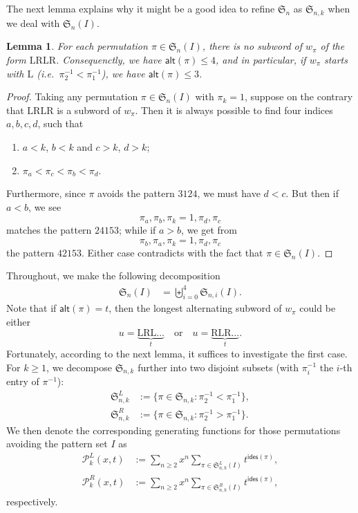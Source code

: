 \documentclass[reqno]{amsart}
\numberwithin{equation}{section}
\theoremstyle{plain}
\newtheorem{lemma}[theorem]{Lemma}
\theoremstyle{definition}
\theoremstyle{named}
\newcommand{\fS}{\mathfrak{S}}
\newcommand{\ides}{\mathsf{ides}}
\newcommand{\alt}{\mathsf{alt}}
\newcommand{\cP}{\mathcal{P}}
\begin{document}
The next lemma explains why it might be a good idea to refine $\fS_n$ as $\fS_{n,k}$ when we deal with $\fS_n(I)$.

\begin{lemma}\label{lem:alt-bound}
	For each permutation $\pi\in\fS_n(I)$, there is no subword of $w_\pi$ of the form $\mathrm{L}\mathrm{R}\mathrm{L}\mathrm{R}$. Consequenctly, we have $\alt(\pi)\le 4$, and in particular, if $w_\pi$ starts with $\mathrm{L}$ (i.e.~$\pi^{-1}_2<\pi^{-1}_1$), we have $\alt(\pi)\le 3$.
\end{lemma}

\begin{proof}
	Taking any permutation $\pi\in\fS_n(I)$ with $\pi_k=1$, suppose on the contrary that $\mathrm{L}\mathrm{R}\mathrm{L}\mathrm{R}$ is a subword of $w_\pi$. Then it is always possible to find four indices $a,b,c,d$, such that
	\begin{enumerate}[label=(\arabic*), widest=9, itemindent=*, leftmargin=*]
		\item $a<k$, $b<k$ and $c>k$, $d>k$;
		\item $\pi_a<\pi_c<\pi_b<\pi_d$.
	\end{enumerate} 
	Furthermore, since $\pi$ avoids the pattern $3124$, we must have $d<c$. But then if $a<b$, we see $$\pi_a,\pi_b,\pi_k=1,\pi_d,\pi_c$$ matches the pattern $24153$; while if $a>b$, we get from $$\pi_b,\pi_a,\pi_k=1,\pi_d,\pi_c$$ the pattern $42153$. Either case contradicts with the fact that $\pi\in\fS_n(I)$.
\end{proof}

Throughout, we make the following decomposition
\begin{align*}
	\fS_n(I) &= \biguplus_{i=0}^4 \fS_{n,i}(I).
\end{align*}
Note that if $\alt(\pi)=t$, then the longest alternating subword of $w_{\pi}$ could be either $$u=\underbrace{\mathrm{L}\mathrm{R}\mathrm{L}\ldots}_{t}\quad\text{or}\quad u=\underbrace{\mathrm{R}\mathrm{L}\mathrm{R}\ldots}_{t}.$$
Fortunately, according to the next lemma, it suffices to investigate the first case. For $k\ge 1$, we decompose $\fS_{n,k}$ further into two disjoint subsets (with $\pi_i^{-1}$ the $i$-th entry of $\pi^{-1}$):
\begin{align*}
	\fS_{n,k}^{L}&:=\{\pi\in\fS_{n,k}: \pi^{-1}_2<\pi^{-1}_1\},\\
	\fS_{n,k}^{R}&:=\{\pi\in\fS_{n,k}: \pi^{-1}_2>\pi^{-1}_1\}.
\end{align*}
We then denote the corresponding generating functions for those permutations avoiding the pattern set $I$ as
\begin{align*}
	\cP_k^L(x,t) &:=\sum_{n\ge 2}x^n\sum_{\pi\in \fS_{n,k}^L(I)}t^{\ides(\pi)},\\
	\cP_k^R(x,t) &:=\sum_{n\ge 2}x^n\sum_{\pi\in \fS_{n,k}^R(I)}t^{\ides(\pi)},
\end{align*}
respectively.
\end{document}
